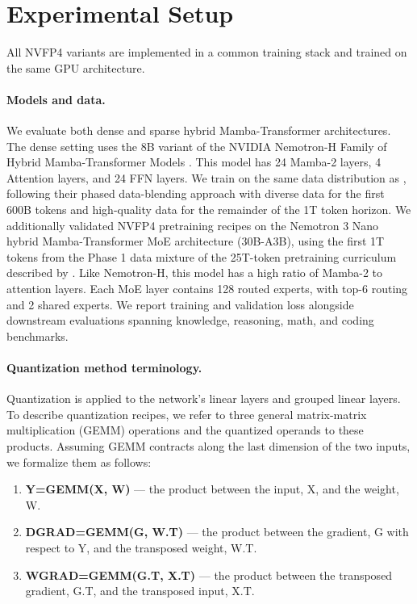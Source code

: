 \section{Experimental Setup}
 All NVFP4 variants are implemented in a common training stack and trained on the same GPU architecture.

\paragraph{Models and data.}
We evaluate both dense and sparse hybrid
Mamba-Transformer architectures. The dense setting uses the 8B variant of the NVIDIA Nemotron-H Family of Hybrid Mamba-Transformer Models \citep{nvidia2025nemotronhfamilyaccurateefficient}. This model has 24 Mamba-2 layers, 4 Attention layers, and 24 FFN layers.  We train on the same data distribution as \citet{nvidia2025nemotronhfamilyaccurateefficient}, following their phased data-blending approach \citep{feng2024maximizedataspotentialenhancing} with diverse data for the first 600B tokens and high-quality data for the remainder of the 1T token horizon. 
 We additionally validated NVFP4 pretraining recipes on the Nemotron 3 Nano hybrid Mamba-Transformer MoE architecture (30B-A3B), using the first 1T tokens from the Phase 1 data mixture of the 25T-token pretraining curriculum described by \citet{nvidia2025nemotron3nanoopen, nvidia2025nvidianemotron3efficient}. Like Nemotron-H, this model has a high ratio of Mamba-2 to attention layers. Each MoE layer contains 128 routed experts, with top-6 routing and 2 shared experts. We report training and validation loss alongside downstream evaluations spanning knowledge, reasoning, math, and coding benchmarks.


\paragraph{Quantization method terminology.}
Quantization is applied to the network's linear layers and grouped linear layers. To describe quantization recipes, we refer to three general matrix-matrix multiplication (GEMM) operations and the quantized operands to these products. Assuming GEMM contracts along the last dimension of the two inputs, we formalize them as follows:
\begin{enumerate}
    \item \textbf{Y=GEMM(X, W)} --- the product between the input, X, and the weight, W.
    \item \textbf{DGRAD=GEMM(G, W.T)} --- the product between the gradient, G with respect to Y, and the transposed weight, W.T.
    \item \textbf{WGRAD=GEMM(G.T, X.T)} --- the product between the transposed gradient, G.T, and the transposed input, X.T.
\end{enumerate}

